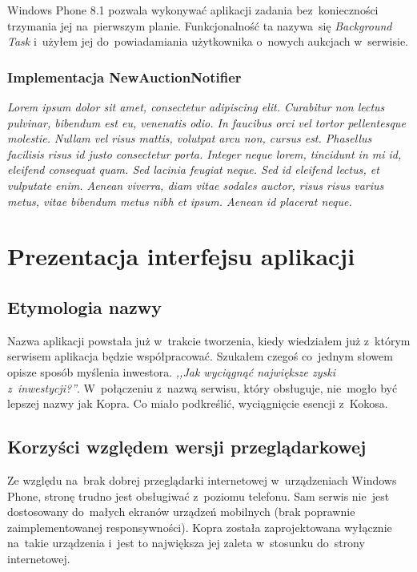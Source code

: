 \documentclass[a4paper,twoside,titlepage,openright]{book}
\begin{document}
Windows Phone 8.1 pozwala wykonywać aplikacji zadania bez~konieczności trzymania jej na~pierwszym planie. Funkcjonalność ta nazywa~się \textit{Background Task} i~użyłem jej do~powiadamiania użytkownika o~nowych aukcjach w~serwisie.

\subsection{Implementacja NewAuctionNotifier}

{\color{red}\textit{Lorem ipsum dolor sit amet, consectetur adipiscing elit. Curabitur non lectus pulvinar, bibendum est eu, venenatis odio. In faucibus orci vel tortor pellentesque molestie. Nullam vel risus mattis, volutpat arcu non, cursus est. Phasellus facilisis risus id justo consectetur porta. Integer neque lorem, tincidunt in mi id, eleifend consequat quam. Sed lacinia feugiat neque. Sed id eleifend lectus, et vulputate enim. Aenean viverra, diam vitae sodales auctor, risus risus varius metus, vitae bibendum metus nibh et ipsum. Aenean id placerat neque. }}





\chapter{Prezentacja interfejsu aplikacji}

\section{Etymologia nazwy}

Nazwa aplikacji powstała już w~trakcie tworzenia, kiedy wiedziałem już z~którym serwisem aplikacja będzie współpracować. Szukałem czegoś co~jednym słowem opisze sposób myślenia inwestora. \textit{,,Jak wyciągnąć największe zyski z~inwestycji?''}. W~połączeniu z~nazwą serwisu, który obsługuje, nie~mogło być lepszej nazwy jak Kopra. Co miało podkreślić, wyciągnięcie esencji z~Kokosa.

\section{Korzyści względem wersji przeglądarkowej}

Ze względu na~brak dobrej przeglądarki internetowej w~urządzeniach Windows Phone, stronę trudno jest obsługiwać z~poziomu telefonu. Sam serwis nie~jest dostosowany do~małych ekranów urządzeń mobilnych (brak poprawnie zaimplementowanej responsywności). Kopra została zaprojektowana wyłącznie na~takie urządzenia i~jest to największa jej zaleta w~stosunku do~strony internetowej. 
\end{document}
